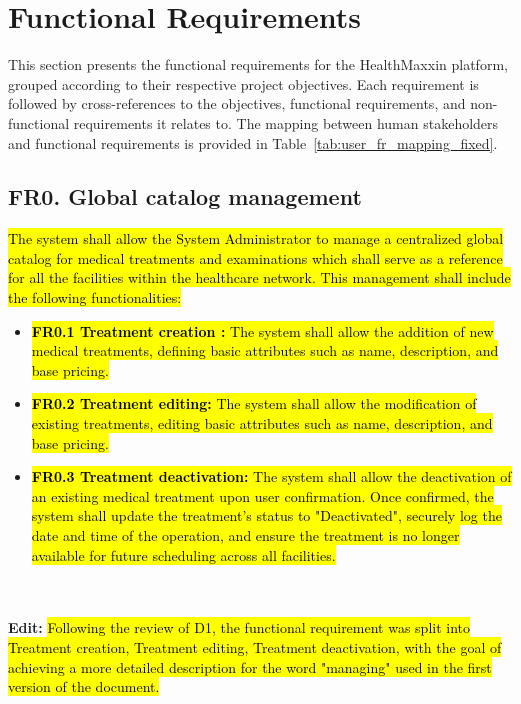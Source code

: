 \documentclass[12pt, a4paper]{article}
\begin{document}
\newpage

\section{Functional Requirements}
This section presents the functional requirements for the HealthMaxxin platform, grouped according to their respective project objectives. Each requirement is followed by cross-references to the objectives, functional requirements, and non-functional requirements it relates to. The mapping between human stakeholders and functional requirements is provided in Table~\ref{tab:user_fr_mapping_fixed}.
\subsection{FR0. Global catalog management} \label{FR0}
\hl{The system shall allow the System Administrator to manage a centralized global catalog for medical treatments and examinations which shall serve as a reference for all the facilities within the healthcare network. This management shall include the following functionalities:}

\begin{itemize}
    \item \hl{\textbf{FR0.1 Treatment creation :} The system shall allow the addition of new medical treatments, defining basic attributes such as name, description, and base pricing.}
    \item \hl{\textbf{FR0.2 Treatment  editing:} The system shall allow the modification of existing treatments, editing basic attributes such as name, description, and base pricing.}
    \item \hl{\textbf{FR0.3 Treatment deactivation:} The system shall allow the deactivation of an existing medical treatment upon user confirmation. Once confirmed, the system shall update the treatment's status to "Deactivated", securely log the date and time of the operation, and ensure the treatment is no longer available for future scheduling across all facilities.}
\end{itemize}
\\
\\ \textbf{Edit:}
\hl{Following the review of D1, the functional requirement was split into Treatment creation, Treatment editing, Treatment deactivation, with the goal of achieving a more detailed description for the word "managing" used in the first version of the document.}
\end{document}
